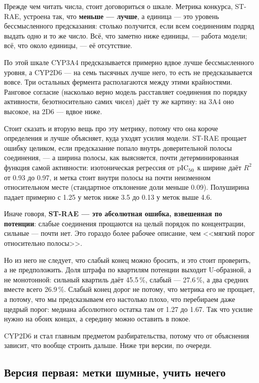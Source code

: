 Прежде чем читать числа, стоит договориться о шкале. Метрика конкурса, ST-RAE, устроена так,
что \textbf{меньше --- лучше}, а единица --- это уровень бессмысленного предсказания: столько
получится, если всем соединениям подряд выдать одно и то же число. Всё, что заметно ниже
единицы, --- работа модели; всё, что около единицы, --- её отсутствие.

По этой шкале CYP3A4 предсказывается примерно вдвое лучше бессмысленного уровня, а CYP2D6 ---
на семь тысячных лучше него, то есть не предсказывается вовсе. Три остальных фермента
располагаются между этими крайностями. Ранговое согласие (насколько верно модель
расставляет соединения по порядку активности, безотносительно самих чисел) даёт ту же
картину: на 3A4 оно высокое, на 2D6 --- вдвое ниже.

Стоит сказать и вторую вещь про эту метрику, потому что она короче определения и лучше
объясняет, куда уходят усилия модели. ST-RAE прощает ошибку целиком, если предсказание попало
внутрь доверительной полосы соединения, --- а ширина полосы, как выясняется, почти
детерминированная функция самой активности: изотоническая регрессия от $\mathrm{pIC}_{50}$ к ширине даёт
$R^2$ от 0.93 до 0.97, и метка стоит внутри полосы на почти неизменном относительном месте
(стандартное отклонение доли меньше 0.09). Полуширина падает примерно с 1.25 у меток ниже 3.5
до 0.13 у меток выше 4.6.

Иначе говоря, \textbf{ST-RAE --- это абсолютная ошибка, взвешенная по потенции}: слабые
соединения прощаются на целый порядок по концентрации, сильные --- почти нет. Это гораздо
более рабочее описание, чем <<мягкий порог относительно полосы>>.

Но из него не следует, что слабый конец можно бросить, и это стоит проверить, а не
предположить. Доля штрафа по квартилям потенции выходит U-образной, а не монотонной: сильный
квартиль даёт 45.5\,\%, слабый --- 27.6\,\%, а два средних вместе всего 26.9\,\%. Слабый конец
дорог не потому, что метрика его не прощает, а потому, что мы предсказываем его настолько
плохо, что перебираем даже щедрый порог: медиана абсолютного остатка там от 1.27 до 1.67. Так
что усилие нужно на обоих концах, а середину можно оставить в покое.

CYP2D6 и стал главным предметом разбирательства, потому что от объяснения зависит, что вообще
строить дальше. Ниже три версии, по очереди.

\subsection{Версия первая: метки шумные, учить нечего}

